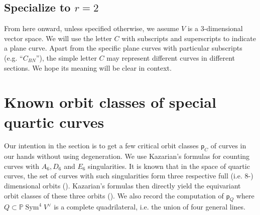 \documentclass[12 pt, reqno]{amsart}
\theoremstyle{definition}
\newcommand{\on}{\operatorname}
\newcommand{\mb}{\mathbb}
\renewcommand{\P}{\mb{P}}
\newcommand{\p}{\mathsf{p}}
\begin{document}

\subsection{Specialize to $r=2$}
\label{sec:specialize2}

From here onward, unless specified otherwise, we assume $V$ is a
$3$-dimensional vector space.  We will use the letter $C$ with
subscripts and superscripts to indicate a plane curve.  Apart from the
specific plane curves with particular subscripts (e.g. ``$C_{BN}$''),
the simple letter $C$ may represent different curves in different
sections.  We hope its meaning will be clear in context.


\section{Known orbit classes of special quartic curves}
\label{stratasection}

Our intention in the section is to get a few critical orbit classes
$\p_{C}$ of curves in our hands without using degeneration. We use
Kazarian's formulas for counting curves with $A_6, D_6$ and $E_6$
singularities. It is known that in the space of quartic curves, the
set of curves with such singularities form three respective full
(i.e. $8$-) dimensional orbits (). Kazarian's formulas
then directly yield the equivariant orbit classes of these three
orbits (). We also record the computation of $\p_{Q}$
where $Q \subset \P \on{Sym}^{4}V^{\vee}$ is a complete quadrilateral,
i.e. the union of four general lines.
\end{document}
